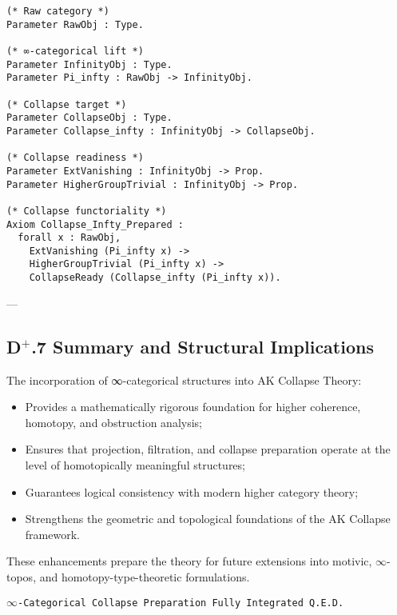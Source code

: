 \documentclass[11pt]{article}
\begin{document}
\begin{lstlisting}[language=Coq]
(* Raw category *)
Parameter RawObj : Type.

(* ∞-categorical lift *)
Parameter InfinityObj : Type.
Parameter Pi_infty : RawObj -> InfinityObj.

(* Collapse target *)
Parameter CollapseObj : Type.
Parameter Collapse_infty : InfinityObj -> CollapseObj.

(* Collapse readiness *)
Parameter ExtVanishing : InfinityObj -> Prop.
Parameter HigherGroupTrivial : InfinityObj -> Prop.

(* Collapse functoriality *)
Axiom Collapse_Infty_Prepared :
  forall x : RawObj,
    ExtVanishing (Pi_infty x) ->
    HigherGroupTrivial (Pi_infty x) ->
    CollapseReady (Collapse_infty (Pi_infty x)).
\end{lstlisting}

---

\subsection*{D$^{+}$.7 Summary and Structural Implications}

The incorporation of ∞-categorical structures into AK Collapse Theory:

\begin{itemize}
    \item Provides a mathematically rigorous foundation for higher coherence, homotopy, and obstruction analysis;
    \item Ensures that projection, filtration, and collapse preparation operate at the level of homotopically meaningful structures;
    \item Guarantees logical consistency with modern higher category theory;
    \item Strengthens the geometric and topological foundations of the AK Collapse framework.
\end{itemize}

These enhancements prepare the theory for future extensions into motivic, $\infty$-topos, and homotopy-type-theoretic formulations.

\begin{flushright}
\texttt{$\infty$-Categorical Collapse Preparation \quad Fully Integrated \quad Q.E.D.}
\end{flushright}



\end{document}
